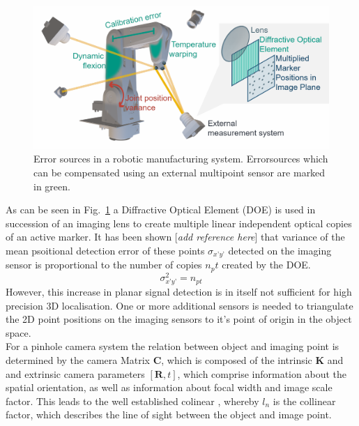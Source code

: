 \documentclass[5p,times,procedia]{elsarticle}
\begin{document}
\begin{figure}[h]
	\centering
	\includegraphics[width=\columnwidth]{graphics/error_sources.png}
	\caption{Error sources in a robotic manufacturing system. Errorsources which can be compensated using an external multipoint  sensor are marked in green.}
	\label{fig:error_sources}
\end{figure}

As can be seen in Fig.~\ref{fig:error_sources} a Diffractive Optical Element (DOE) is used in succession of an imaging lens to create multiple linear independent optical copies of an active marker.
It has been shown [\textit{add reference here}] that variance of the mean psoitional detection error of these points $\sigma_{x’y’}$ detected on the imaging sensor is proportional to the number of copies $n_pt$ created by the DOE.
\begin{equation}
	\sigma_{x’y’}^2 = n_{pt}^{}
\end{equation}
However, this increase in planar signal detection is in itself not sufficient for high precision 3D localisation. One or more additional sensors is needed to triangulate the 2D point positions on the imaging sensors to it’s point of origin in the object space. \\
For a pinhole camera system the relation between object and imaging point is determined by the camera Matrix $\mathbf{C}$, which is composed of the intrinsic $\mathbf{K}$ and  and extrinsic camera parameters $[\mathbf{R}, t]$, which comprise information about the spatial orientation, as well as information about focal width and
image scale factor. This leads to the well established colinear \cite{Luhmann2003}, whereby $l_n$ is the collinear factor, which describes the line of sight between the object and image point.
\end{document}
